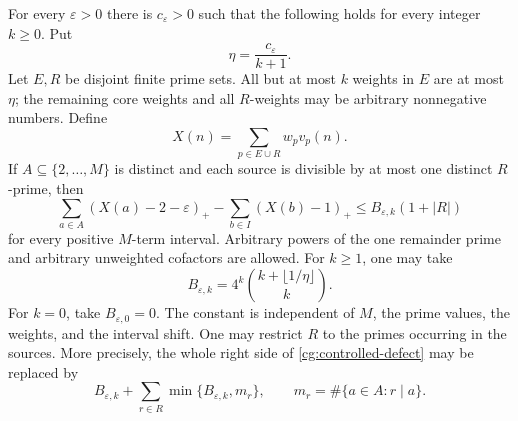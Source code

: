 \begin{theorem}
\label{thm:cg-controlled}
For every \(\varepsilon>0\) there is \(c_\varepsilon>0\) such
that the following holds for every integer \(k\ge0\). Put
\[
 \eta=\frac{c_\varepsilon}{k+1}.
\]
Let \(E,R\) be disjoint finite prime sets. All but at most \(k\)
weights in \(E\) are at most \(\eta\); the remaining core weights
and all \(R\)-weights may be arbitrary nonnegative numbers. Define
\[
 X(n)=\sum_{p\in E\cup R}w_pv_p(n).
\]
If \(A\subseteq\{2,\ldots,M\}\) is distinct and each source is
divisible by at most one distinct \(R\)-prime, then
\begin{equation}
 \sum_{a\in A}(X(a)-2-\varepsilon)_+
       -\sum_{b\in I}(X(b)-1)_+
 \le B_{\varepsilon,k}(1+|R|)
 \label{cg:controlled-defect}
\end{equation}
for every positive \(M\)-term interval. Arbitrary powers of the
one remainder prime and arbitrary unweighted cofactors are allowed.
For \(k\ge1\), one may take
\begin{equation}
 B_{\varepsilon,k}
 =4^k\binom{k+\lfloor1/\eta\rfloor}{k}.
 \label{cg:error-constants}
\end{equation}
For \(k=0\), take \(B_{\varepsilon,0}=0\). The constant is
independent of \(M\), the prime values, the weights, and the interval
shift. One may restrict \(R\) to the primes occurring in the
sources. More precisely, the whole right side of
\eqref{cg:controlled-defect} may be replaced by
\begin{equation}
 B_{\varepsilon,k}+\sum_{r\in R}\min\{B_{\varepsilon,k},m_r\},
 \qquad m_r=\#\{a\in A:r\mid a\}.
 \label{cg:fibre-refinement}
\end{equation}
\end{theorem}

